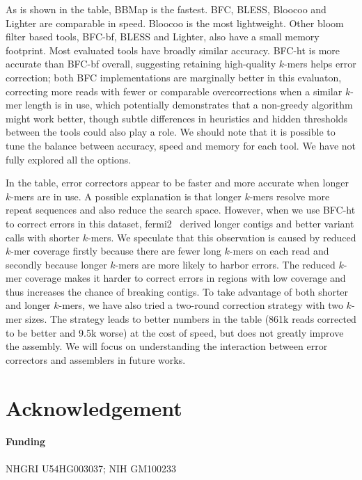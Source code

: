 \documentclass{bioinfo}
\begin{document}
As is shown in the table, BBMap is the fastest. BFC, BLESS, Bloocoo and Lighter
are comparable in speed. Bloocoo is the most lightweight. Other bloom filter
based tools, BFC-bf, BLESS and Lighter, also have a small memory footprint.
Most evaluated tools have broadly similar accuracy.  BFC-ht is more accurate
than BFC-bf overall, suggesting retaining high-quality $k$-mers helps error
correction; both BFC implementations are marginally better in this evaluaton,
correcting more reads with fewer or comparable overcorrections when a similar
$k$-mer length is in use, which potentially demonstrates that a non-greedy
algorithm might work better, though subtle differences in heuristics and hidden
thresholds between the tools could also play a role.  We should note that it is
possible to tune the balance between accuracy, speed and memory for each tool.
We have not fully explored all the options.

In the table, error correctors appear to be faster and more accurate when
longer $k$-mers are in use. A possible explanation is that longer $k$-mers
resolve more repeat sequences and also reduce the search space. However, when
we use BFC-ht to correct errors in this dataset, fermi2~\citep{Li:2012fk}
derived longer contigs and better variant calls with shorter $k$-mers. We
speculate that this observation is caused by reduced $k$-mer coverage firstly
because there are fewer long $k$-mers on each read and secondly because longer
$k$-mers are more likely to harbor errors. The reduced $k$-mer coverage makes
it harder to correct errors in regions with low coverage and thus increases the
chance of breaking contigs.  To take advantage of both shorter and longer
$k$-mers, we have also tried a two-round correction strategy with two $k$-mer
sizes. The strategy leads to better numbers in the table (861k reads corrected
to be better and 9.5k worse) at the cost of speed, but does not greatly improve
the assembly. We will focus on understanding the interaction between error
correctors and assemblers in future works.


\section*{Acknowledgement}
\paragraph{Funding\textcolon} NHGRI U54HG003037; NIH GM100233


\end{document}
